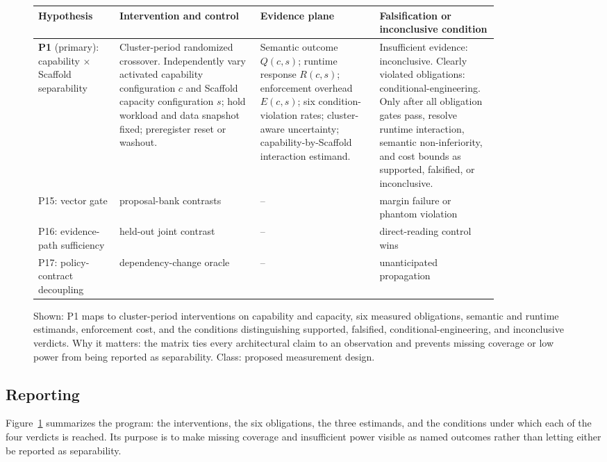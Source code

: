 \documentclass[11pt]{article}
\begin{document}
\begin{figure}[t]
\centering
\renewcommand{\arraystretch}{1.25}
\small
\begin{tabular}{p{0.15\linewidth}p{0.26\linewidth}p{0.22\linewidth}p{0.22\linewidth}}
\hline
\textbf{Hypothesis} & \textbf{Intervention and control} & \textbf{Evidence plane} & \textbf{Falsification or inconclusive condition} \\
\hline
\textbf{P1} (primary): capability $\times$ Scaffold separability &
Cluster-period randomized crossover. Independently vary activated capability configuration $c$ and Scaffold capacity configuration $s$; hold workload and data snapshot fixed; preregister reset or washout. &
Semantic outcome $Q(c,s)$; runtime response $R(c,s)$; enforcement overhead $E(c,s)$; six condition-violation rates; cluster-aware uncertainty; capability-by-Scaffold interaction estimand. &
Insufficient evidence: inconclusive. Clearly violated obligations: conditional-engineering. Only after all obligation gates pass, resolve runtime interaction, semantic non-inferiority, and cost bounds as supported, falsified, or inconclusive. \\
\hline
P15: vector gate & proposal-bank contrasts & -- & margin failure or phantom violation \\
P16: evidence-path sufficiency & held-out joint contrast & -- & direct-reading control wins \\
P17: policy-contract decoupling & dependency-change oracle & -- & unanticipated propagation \\
\hline
\end{tabular}

\caption{Shown: P1 maps to cluster-period interventions on capability and capacity, six measured obligations, semantic and runtime estimands, enforcement cost, and the conditions distinguishing supported, falsified, conditional-engineering, and inconclusive verdicts. Why it matters: the matrix ties every architectural claim to an observation and prevents missing coverage or low power from being reported as separability. Class: proposed measurement design.}
\label{fig:evaluation-matrix}
\end{figure}

\subsection{Reporting}

Figure~\ref{fig:evaluation-matrix} summarizes the program: the interventions, the six obligations, the three estimands, and the conditions under which each of the four verdicts is reached. Its purpose is to make missing coverage and insufficient power visible as named outcomes rather than letting either be reported as separability.
\end{document}
